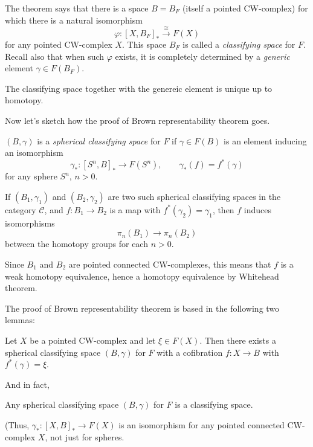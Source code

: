 \begin{definition}
\begin{remark}
	The theorem says that there is a space $B=B_{F}$ (itself a pointed CW-complex) for which there is a natural isomorphism
	$$\varphi :[X,B_{F}]_{*}\overset{\cong }{\longrightarrow}F(X)$$
	for any pointed CW-complex $X$. This space $B_{F}$ is called a {\it classifying space} for $F$. Recall also that when such $\varphi$ exists, it is completely determined by a \textit{generic} element $\gamma\in F(B_{F})$.

	The classifying space together with the genereic element is unique up to homotopy.
\end{remark}

Now let's sketch how the proof of Brown representability theorem goes.

\begin{definition}
	$(B,\gamma)$ is a {\it spherical classifying space} for $F$ if $\gamma\in F(B)$ is an element inducing an isomorphism
	$$\gamma_{*}:[S^{n},B]_{*}\to F(S^{n}),\qquad \gamma_{*}(f)=f^{*} (\gamma)$$
	for any sphere $S^{n}$, $n>0$.
\end{definition}

\begin{remark}
	If $(B_{1},\gamma_{1})$ and $(B_{2},\gamma_{2})$ are two such spherical classifying spaces in the category $\mathcal{C}$, and $f:B_{1}\to B_{2}$ is a map with $f^{*} (\gamma_{2})=\gamma_{1}$, then $f$ induces isomorphisms
	$$\pi_{n}(B_{1})\to \pi_{n}(B_{2})$$
	between the homotopy groups for each $n>0$.

	Since $B_{1}$ and $B_{2}$ are pointed connected CW-complexes, this means that $f$ is a weak homotopy equivalence, hence a homotopy equivalence by Whitehead theorem.
\end{remark}

The proof of Brown representability theorem is based in the following two lemmas:

\begin{lemma}
	Let $X$ be a pointed CW-complex and let $\xi \in F(X)$. Then there exists a spherical classifying space $(B,\gamma)$ for $F$ with a cofibration  $f:X\to B$ with $f^{*} (\gamma)=\xi$.
\end{lemma}

And in fact,

\begin{lemma}
	Any spherical classifying space $(B,\gamma)$ for $F$ is a classifying space.

	(Thus, $\gamma_{*}:[X,B]_{*}\to F(X)$ is an isomorphism for any pointed connected CW-complex $X$, not just for spheres.
\end{lemma}


\end{definition}
